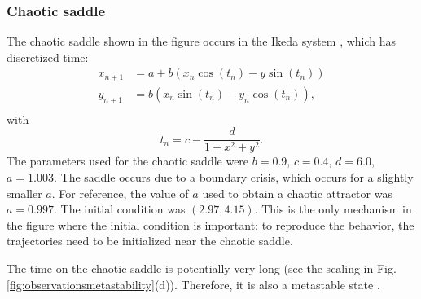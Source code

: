 \documentclass[reprint,onecolumn,superscriptaddress,showpacs,amsmath,amssymb,aps,floatfix]{revtex4-2}
\theoremstyle{definition}
\begin{document}
\subsubsection{Chaotic saddle}
The chaotic saddle shown in the figure occurs in the Ikeda system \cite{alligood1997book}, which has discretized time:
\begin{align}
    x_{n+1} &= a+b(x_n \cos(t_n) - y \sin(t_n)) \\ 
    y_{n+1} &= b(x_n \sin(t_n) - y_n \cos(t_n)), \\ 
\end{align}
with 
\begin{equation}
    t_n = c - \frac{d}{1 + x^2 + y^2}.
\end{equation}
The parameters used for the chaotic saddle were $b = 0.9$, $c = 0.4$, $d = 6.0$, $a = 1.003$. The saddle occurs due to a boundary crisis, which occurs for a slightly smaller $a$. For reference, the value of $a$ used to obtain a chaotic attractor was $a = 0.997$. The initial condition was $(2.97, 4.15)$. This is the only mechanism in the figure where the initial condition is important: to reproduce the behavior, the trajectories need to be initialized near the chaotic saddle.


The time on the chaotic saddle is potentially very long (see the scaling in Fig. \ref{fig:observationsmetastability}(d)). Therefore, it is also a metastable state \cite{yorke1979metastable}.








% 


\end{document}
